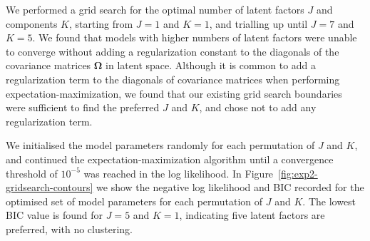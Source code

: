 \documentclass[twocolumn]{aastex62}
\newcommand{\vect}[1]{\boldsymbol{\mathbf{#1}}}
\renewcommand{\vec}[1]{\vect{#1}}
\newcommand{\scorecovs}{\vec\Omega}
\newcommand{\NumLatentFactors}{J}
\newcommand{\NumComponents}{K}
\begin{document}
We performed a grid search for the optimal number of latent factors 
$\NumLatentFactors$ and components $\NumComponents$, starting from 
$\NumLatentFactors = 1$ and $K = 1$, and trialling up until 
$\NumLatentFactors = 7$ and $\NumComponents = 5$. 
We found that models with higher numbers of latent factors were unable to
converge without adding a regularization constant to the diagonals of the
covariance matrices $\scorecovs$ in latent space. Although it is common
to add a regularization term to the diagonals of covariance matrices
when performing expectation-maximization, we found that our existing
grid search boundaries were sufficient to find the preferred $\NumLatentFactors$
and $\NumComponents$, and chose not to add any regularization term.

We initialised
the model parameters randomly for each permutation of $J$ and $K$, and continued
the expectation-maximization algorithm
until a convergence threshold of $10^{-5}$ was reached in the log likelihood. 
In Figure~\ref{fig:exp2-gridsearch-contours} we show the negative log likelihood 
and BIC recorded for the optimised set of model parameters for each permutation 
of $J$ and $K$. The lowest BIC value is found for $J = 5$ and $K = 1$, indicating
five latent factors are preferred, with no clustering.
\end{document}
